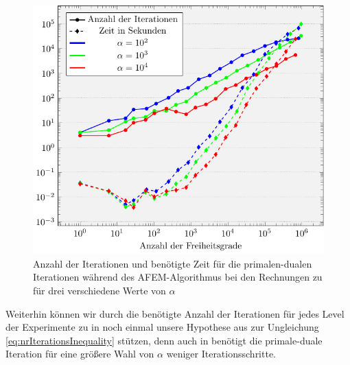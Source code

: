 \begin{figure}[p]
  \centering
  \includegraphics[width=.8\linewidth]
    {pictures/chapExperiments/secConclusion/nrIterComp/grayscale/misc.pdf}
  \caption{Anzahl der Iterationen und benötigte Zeit für die primalen-dualen
    Iterationen während des AFEM-Algorithmus bei den Rechnungen zu
     für drei verschiedene Werte von $\alpha$}  
  \label{fig:denoiseNrIterComparison}
\end{figure}
Weiterhin können wir durch die benötigte Anzahl der Iterationen für jedes Level
der Experimente zu  in
 noch einmal unsere Hypothese aus 
 zur Ungleichung \eqref{eq:nrIterationsInequality}
stützen, denn auch in  benötigt die
primale-duale Iteration für eine größere Wahl von $\alpha$ weniger
Iterationsschritte.

